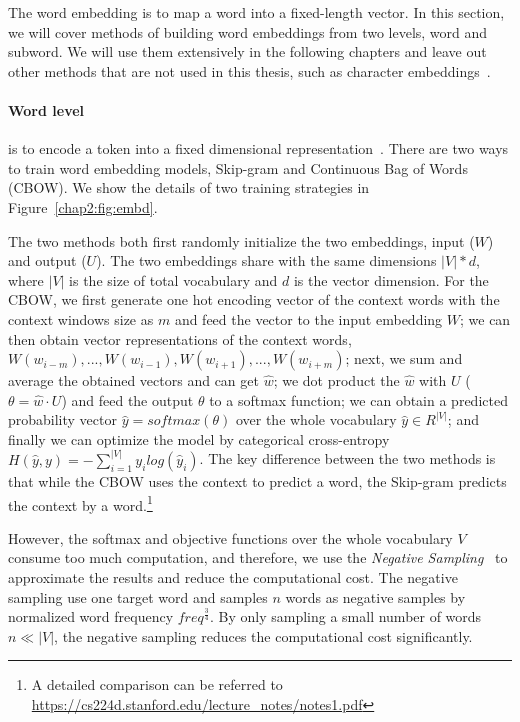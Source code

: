 The word embedding is to map a word into a fixed-length vector. 
In this section, we will cover methods of building word embeddings from two levels, word and subword. 
We will use them extensively in the following chapters and leave out other methods that are not used in this thesis, such as character embeddings~\cite{zhang2015character}.

\paragraph{Word level} is to encode a token into a fixed dimensional representation~\cite{mikolov2013distributed, pennington2014glove}. 
There are two ways to train word embedding models, Skip-gram and Continuous Bag of Words (CBOW).
We show the details of two training strategies in Figure~\ref{chap2:fig:embd}.

The two methods both first randomly initialize the two embeddings, input ($W$) and output ($U$).
The two embeddings share with the same dimensions $|V| * d$, where $|V|$ is the size of total vocabulary and $d$ is the vector dimension.
For the CBOW, we first generate one hot encoding vector of the context words with the context windows size as $m$ and feed the vector to the input embedding $W$; we can then obtain vector representations of the context words, $W(w_{i-m}), ..., W(w_{i-1}), W(w_{i+1}), ..., W(w_{i+m})$; next, we sum and average the obtained vectors and can get $\hat{w}$; we dot product the $\hat{w}$ with $U$ ($\theta = \hat{w} \cdot U $) and feed the output $\theta$ to a softmax function; we can obtain a predicted probability vector $\hat{y} = softmax(\theta)$ over the whole vocabulary $\hat{y} \in R^{|V|}$; and finally we can optimize the model by categorical cross-entropy $H(\hat{y}, y) = -\sum^{|V|}_{i=1}y_ilog(\hat{y}_i)$.
The key difference between the two methods is that while the CBOW uses the context to predict a word, the Skip-gram predicts the context by a word.\footnote{A detailed comparison can be referred to \url{https://cs224d.stanford.edu/lecture_notes/notes1.pdf}}

However, the softmax and objective functions over the whole vocabulary $V$ consume too much computation, and therefore, we use the \textit{Negative Sampling}~\cite{mikolov2013distributed} to approximate the results and reduce the computational cost.
The negative sampling use one target word and samples $n$ words as negative samples by normalized word frequency $freq^{\frac{3}{4}}$.
By only sampling a small number of words $n \ll |V|$, the negative sampling reduces the computational cost significantly.


